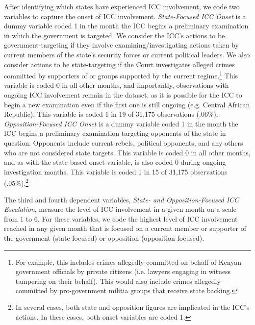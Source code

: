 After identifying which states have experienced ICC involvement, we code two variables to capture the onset of ICC involvement. \emph{State-Focused ICC Onset} is a dummy variable coded 1 in the month the ICC begins a preliminary examination in which the government is targeted. We consider the ICC's actions to be government-targeting if they involve examining/investigating actions taken by current members of the state's security forces or current political leaders. We also consider actions to be state-targeting if the Court investigates alleged crimes committed by supporters of or groups supported by the current regime.\footnote{For example, this includes crimes allegedly committed on behalf of Kenyan government officials by private citizens (i.e. lawyers engaging in witness tampering on their behalf). This would also include crimes allegedly committed by pro-government militia groups that receive state backing.} This variable is coded 0 in all other months, and importantly, observations with ongoing ICC involvement remain in the dataset, as it is possible for the ICC to begin a new examination even if the first one is still ongoing (e.g. Central African Republic). This variable is coded 1 in 19 of 31,175 observations (.06\%). \emph{Opposition-Focused ICC Onset} is a dummy variable coded 1 in the month the ICC begins a preliminary examination targeting opponents of the state in question. Opponents include current rebels, political opponents, and any others who are not considered state targets. This variable is coded 0 in all other months, and as with the state-based onset variable, is also coded 0 during ongoing investigation months. This variable is coded 1 in 15 of 31,175 observations (.05\%).\footnote{In several cases, both state and opposition figures are implicated in the ICC's actions. In these cases, both onset variables are coded 1.}

The third and fourth dependent variables, \emph{State- and Opposition-Focused ICC Escalation}, measure the level of ICC involvement in a given month on a scale from 1 to 6. For these variables, we code the highest level of ICC involvement reached in any given month that is focused on a current member or supporter of the government (state-focused) or opposition (opposition-focused).

